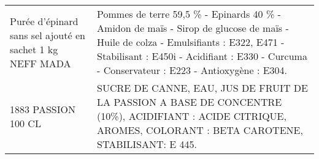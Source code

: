\begin{longtable}{p{5cm}p{10cm}}
                                                 Purée d'épinard sans sel ajouté en sachet 1 kg NEFF MADA &                                                                                                                                                                                                                                                                                                                                                                                                                                                                                                                                                                                                                                                                                                                                                                                                          Pommes de terre 59,5 \% - Epinards 40 \% - Amidon de maïs - Sirop de glucose de maïs - Huile de colza - Emulsifiants : E322, E471 - Stabilisant : E450i - Acidifiant : E330 - Curcuma - Conservateur : E223 - Antioxygène : E304. \\
                                                                                      1883 PASSION 100 CL &                                                                                                                                                                                                                                                                                                                                                                                                                                                                                                                                                                                                                                                                                                                                                                                                                                                                            SUCRE DE CANNE, EAU, JUS DE FRUIT DE LA PASSION A BASE DE CONCENTRE (10\%), ACIDIFIANT : ACIDE CITRIQUE, AROMES, COLORANT : BETA CAROTENE, STABILISANT: E 445. \\

\end{longtable}

